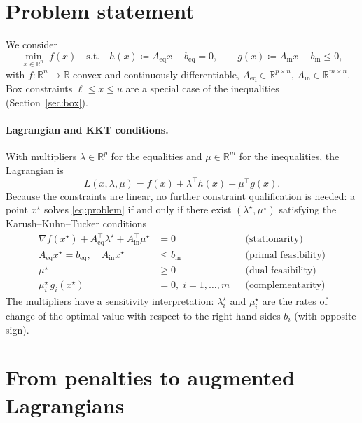 \documentclass[11pt,a4paper]{article}
\newcommand{\R}{\mathbb{R}}
\newcommand{\Aeq}{A_{\mathrm{eq}}}
\newcommand{\beq}{b_{\mathrm{eq}}}
\newcommand{\Ain}{A_{\mathrm{in}}}
\newcommand{\bin}{b_{\mathrm{in}}}
\begin{document}
\section{Problem statement}

We consider
\begin{equation}\label{eq:problem}
  \min_{x\in\R^n} \; f(x)
  \quad\text{s.t.}\quad
  h(x) \coloneqq \Aeq x - \beq = 0, \qquad
  g(x) \coloneqq \Ain x - \bin \le 0,
\end{equation}
with $f:\R^n\to\R$ convex and continuously differentiable,
$\Aeq\in\R^{p\times n}$, $\Ain\in\R^{m\times n}$. Box constraints
$\ell \le x \le u$ are a special case of the inequalities
(Section~\ref{sec:box}).

\paragraph{Lagrangian and KKT conditions.}
With multipliers $\lambda\in\R^p$ for the equalities and $\mu\in\R^m$ for the
inequalities, the Lagrangian is
\[
  L(x,\lambda,\mu) = f(x) + \lambda^\top h(x) + \mu^\top g(x).
\]
Because the constraints are linear, no further constraint qualification is
needed: a point $x^\star$ solves \eqref{eq:problem} if and only if there exist
$(\lambda^\star,\mu^\star)$ satisfying the Karush--Kuhn--Tucker conditions
\begin{align}
  \nabla f(x^\star) + \Aeq^\top\lambda^\star + \Ain^\top\mu^\star &= 0
    && \text{(stationarity)} \label{eq:kkt-stat}\\
  \Aeq x^\star = \beq, \quad \Ain x^\star &\le \bin
    && \text{(primal feasibility)} \label{eq:kkt-feas}\\
  \mu^\star &\ge 0
    && \text{(dual feasibility)} \\
  \mu^\star_i\, g_i(x^\star) &= 0,\; i=1,\dots,m
    && \text{(complementarity)} \label{eq:kkt-comp}
\end{align}
The multipliers have a sensitivity interpretation: $\lambda^\star_i$ and
$\mu^\star_i$ are the rates of change of the optimal value with respect to the
right-hand sides $b_i$ (with opposite sign).

\section{From penalties to augmented Lagrangians}
\end{document}
